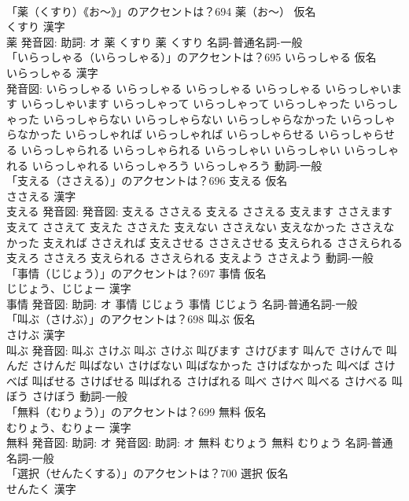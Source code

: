 \documentclass[8pt]{extreport}
\begin{document}
\begin{CJK}{UTF8}{min}
\\	「薬（くすり）《お〜》」のアクセントは？694	薬（お〜） 仮名　
\\	くすり 漢字　
\\	薬 発音図: 助詞: オ	薬 くすり		薬 くすり				名詞-普通名詞-一般 
\\	「いらっしゃる（いらっしゃる）」のアクセントは？695	いらっしゃる 仮名　
\\	いらっしゃる 漢字　
\\	発音図:	いらっしゃる いらっしゃる		いらっしゃる いらっしゃる いらっしゃいます いらっしゃいます いらっしゃって いらっしゃって いらっしゃった いらっしゃった いらっしゃらない いらっしゃらない いらっしゃらなかった いらっしゃらなかった いらっしゃれば いらっしゃれば いらっしゃらせる いらっしゃらせる いらっしゃられる いらっしゃられる いらっしゃい いらっしゃい いらっしゃれる いらっしゃれる いらっしゃろう いらっしゃろう				動詞-一般 
\\	「支える（ささえる）」のアクセントは？696	支える 仮名　
\\	ささえる 漢字　
\\	支える 発音図: 発音図:	支える ささえる		支える ささえる 支えます ささえます 支えて ささえて 支えた ささえた 支えない ささえない 支えなかった ささえなかった 支えれば ささえれば 支えさせる ささえさせる 支えられる ささえられる 支えろ ささえろ 支えられる ささえられる 支えよう ささえよう				動詞-一般 
\\	「事情（じじょう）」のアクセントは？697	事情 仮名　
\\	じじょう、じじょー 漢字　
\\	事情 発音図: 助詞: オ	事情 じじょう		事情 じじょう				名詞-普通名詞-一般 
\\	「叫ぶ（さけぶ）」のアクセントは？698	叫ぶ 仮名　
\\	さけぶ 漢字　
\\	叫ぶ 発音図:	叫ぶ さけぶ		叫ぶ さけぶ 叫びます さけびます 叫んで さけんで 叫んだ さけんだ 叫ばない さけばない 叫ばなかった さけばなかった 叫べば さけべば 叫ばせる さけばせる 叫ばれる さけばれる 叫べ さけべ 叫べる さけべる 叫ぼう さけぼう				動詞-一般 
\\	「無料（むりょう）」のアクセントは？699	無料 仮名　
\\	むりょう、むりょー 漢字　
\\	無料 発音図: 助詞: オ 発音図: 助詞: オ	無料 むりょう		無料 むりょう				名詞-普通名詞-一般 
\\	「選択（せんたくする）」のアクセントは？700	選択 仮名　
\\	せんたく 漢字　

\end{CJK}
\end{document}
